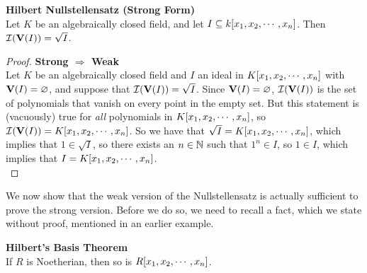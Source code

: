 \documentclass[twoside]{report}
\begin{document}
\begin{theorem} \textbf{Hilbert Nullstellensatz (Strong Form)}\\ 

  Let $K$ be an algebraically closed field, and let $I \subseteq
  k[x_1, x_2,\cdots,x_n]$.  Then $\mathcal{I}(\mathbf{V}(I)) = \sqrt{I}$.
\end{theorem}

\begin{proof} \textbf{Strong $\Rightarrow$ Weak}\\
 
  Let $K$ be an algebraically closed field and $I$ an ideal in
  $K[x_1, x_2,\cdots,x_n]$ with $\mathbf{V}(I) = \varnothing$, and suppose that
  $\mathcal{I}(\mathbf{V}(I)) = \sqrt{I}$.  Since $\mathbf{V}(I) =
  \varnothing$, $\mathcal{I}(\mathbf{V}(I))$ is the set of polynomials that
  vanish on every point in the empty set.  But this statement is
  (vacuously) true for \emph{all} polynomials in $K[x_1, x_2,\cdots,x_n]$, so
  $\mathcal{I}(\mathbf{V}(I)) = K[x_1, x_2,\cdots,x_n]$.  So we have that $\sqrt{I} =
  K[x_1, x_2,\cdots,x_n]$, which implies that $1 \in \sqrt{I}$, so there exists an
  $n \in \mathbb{N}$ such that $1^n \in I$, so $1 \in I$, which implies
  that $I = K[x_1, x_2,\cdots,x_n]$.\\

\end{proof}

We now show that the weak version of the Nullstellensatz is actually
sufficient to prove the strong version.  Before we do so, we need to
recall a fact, which we state without proof, mentioned in an earlier
example.

\begin{theorem} \textbf{Hilbert's Basis Theorem}\\

  If $R$ is Noetherian, then so is $R[x_1, x_2,\cdots,x_n]$.
  
\end{theorem}
\end{document}
